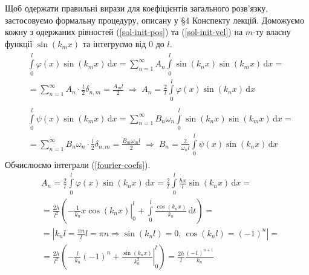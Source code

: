 Щоб одержати правильні вирази для коефіцієнтів загального розв'язку, застосовуємо формальну процедуру, описану у §4 Конспекту лекцій. Доможуємо кожну з одержаних рівностей (\ref{sol-init-pos}) та (\ref{sol-init-vel}) на $m$-ту власну функції $\sin(k_m x)$ та інтегруємо від $0$ до $l$. 
\begin{subequations} \label{fourier-coefs}
    \begin{gather}
        \begin{aligned}
            &\int\limits_0^l \varphi(x) \sin(k_m x) \,\mathrm{d}x = \sum^{\infty}_{n=1} A_n \int\limits_0^l \sin(k_n x) \sin(k_m x) \,\mathrm{d}x =\\
            &= \sum^{\infty}_{n=1} A_n \cdot \frac{l}{2} \delta_{n,m} = \frac{A_m l}{2}
            \;\Rightarrow\;
            A_n = \frac{2}{l} \int\limits_0^l \varphi(x) \sin(k_n x) \,\mathrm{d}x 
        \end{aligned}\\
        \begin{aligned}
            &\int\limits_0^l \psi(x) \sin(k_m x) \,\mathrm{d}x = \sum^{\infty}_{n=1} B_n\omega_n \int\limits_0^l \sin(k_n x) \sin(k_m x) \,\mathrm{d}x =\\
            &= \sum^{\infty}_{n=1} B_n\omega_n \cdot \frac{l}{2} \delta_{n,m} = \frac{B_m \omega_m l}{2}
            \;\Rightarrow\;
            B_n = \frac{2}{\omega_n l} \int\limits_0^l \psi(x) \sin(k_n x) \,\mathrm{d}x
        \end{aligned}
    \end{gather}
\end{subequations} 
Обчислюємо інтеграли (\ref{fourier-coefs}).
\begin{equation*}
    \begin{aligned}
        &A_n = \frac{2}{l} \int\limits_0^l \varphi(x) \sin(k_n x) \,\mathrm{d}x = \frac{2}{l} \int\limits_0^l \frac{hx}{l} \sin(k_n x) \,\mathrm{d}x =\\
        &= \frac{2h}{l^2} \left(\left.-\frac{1}{k_n} x \cos(k_n x)\right|_0^l + \int\limits_0^l \frac{\cos(k_n x)}{k_n} \,\mathrm{d}t\right) =\\
        &= \left| k_n l = \frac{\pi n}{l} l = \pi n \Rightarrow \sin(k_n l) = 0,\, \cos(k_n l) = (-1)^n \right| =\\
        &= \frac{2h}{l^2} \left(-\frac{l}{k_n}(-1)^n + \left.\frac{\sin(k_n x)}{k_n^2}\right|_0^l \right) = \frac{2h}{l} \frac{(-1)^{n+1}}{k_n}
    \end{aligned}
\end{equation*}
